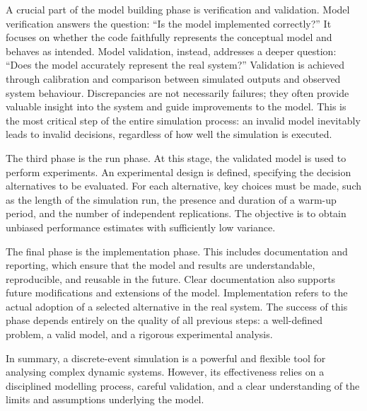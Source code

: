 A crucial part of the model building phase is verification and validation. Model verification answers the question: “Is the model implemented correctly?” It focuses on whether the code faithfully represents the conceptual model and behaves as intended. Model validation, instead, addresses a deeper question: “Does the model accurately represent the real system?” Validation is achieved through calibration and comparison between simulated outputs and observed system behaviour. Discrepancies are not necessarily failures; they often provide valuable insight into the system and guide improvements to the model. This is the most critical step of the entire simulation process: an invalid model inevitably leads to invalid decisions, regardless of how well the simulation is executed.

The third phase is the run phase. At this stage, the validated model is used to perform experiments. An experimental design is defined, specifying the decision alternatives to be evaluated. For each alternative, key choices must be made, such as the length of the simulation run, the presence and duration of a warm-up period, and the number of independent replications. The objective is to obtain unbiased performance estimates with sufficiently low variance.

The final phase is the implementation phase. This includes documentation and reporting, which ensure that the model and results are understandable, reproducible, and reusable in the future. Clear documentation also supports future modifications and extensions of the model. Implementation refers to the actual adoption of a selected alternative in the real system. The success of this phase depends entirely on the quality of all previous steps: a well-defined problem, a valid model, and a rigorous experimental analysis.

In summary, a discrete-event simulation is a powerful and flexible tool for analysing complex dynamic systems. However, its effectiveness relies on a disciplined modelling process, careful validation, and a clear understanding of the limits and assumptions underlying the model.

